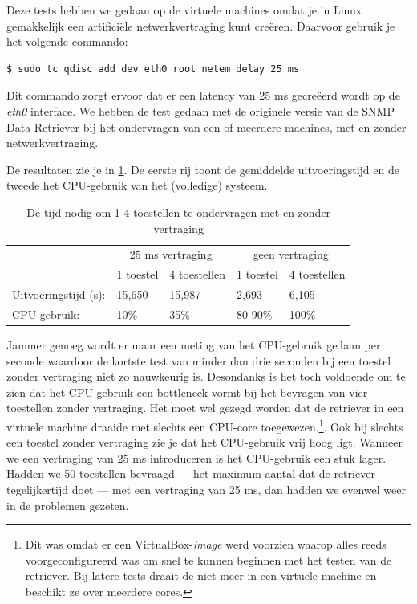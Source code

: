 Deze tests hebben we gedaan op de virtuele machines omdat je in Linux gemakkelijk een artificiële netwerkvertraging kunt creëren.
Daarvoor gebruik je het volgende commando:

\begin{lstlisting}[language=bash, caption={Artificiële netwerkvertraging creëren in Linux}]
$ sudo tc qdisc add dev eth0 root netem delay 25 ms
\end{lstlisting}

Dit commando zorgt ervoor dat er een latency van 25 ms gecreëerd wordt op de \textit{eth0} interface.
We hebben de test gedaan met de originele versie van de SNMP Data Retriever bij het ondervragen van een of meerdere machines,
met en zonder netwerkvertraging.

De resultaten zie je in \cref{tabel-latency}.
De eerste rij toont de gemiddelde uitvoeringstijd en de tweede het CPU-gebruik van het (volledige) systeem.

\begin{table}[h]
\centering
\begin{tabular}{@{}lllll@{}}
\toprule
                      & \multicolumn{2}{c}{25 ms vertraging} & \multicolumn{2}{c}{geen vertraging} \\
                      & 1 toestel       & 4 toestellen       & 1 toestel       & 4 toestellen      \\ \midrule
Uitvoeringstijd (s):  & 15,650          & 15,987             & 2,693           & 6,105             \\
CPU-gebruik:          & 10\%            & 35\%               & 80-90\%         & 100\%    		   \\ \bottomrule
\end{tabular}
\caption{De tijd nodig om 1-4 toestellen te ondervragen met en zonder vertraging}
\label{tabel-latency}
\end{table}

Jammer genoeg wordt er maar een meting van het CPU-gebruik gedaan per seconde waardoor
de kortste test van minder dan drie seconden bij een toestel zonder vertraging niet zo nauwkeurig is.
Desondanks is het toch voldoende om te zien dat het CPU-gebruik een bottleneck vormt bij het bevragen van vier toestellen zonder vertraging.
Het moet wel gezegd worden dat de retriever in een virtuele machine draaide met slechts een CPU-core toegewezen.\footnote{
	Dit was omdat er een VirtualBox-\textit{image} werd voorzien waarop alles reeds voorgeconfigureerd was om snel te kunnen beginnen met het testen van de retriever.
	Bij latere tests draait de \nwmretriever{} niet meer in een virtuele machine en beschikt ze over meerdere cores.
}.
Ook bij slechts een toestel zonder vertraging zie je dat het CPU-gebruik vrij hoog ligt.
Wanneer we een vertraging van 25 ms introduceren is het CPU-gebruik een stuk lager.
Hadden we 50 toestellen bevraagd --- het maximum aantal dat de retriever tegelijkertijd doet --- met een vertraging van 25 ms,
dan hadden we evenwel weer in de problemen gezeten.

